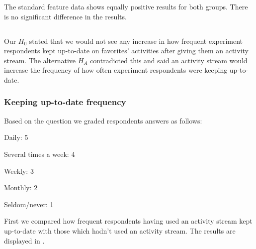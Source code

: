 The standard feature data shows equally positive results for both groups.
There is no significant difference in the results.

\subsection{%
}

Our $H_0$ stated that we would not see any increase in how frequent
experiment respondents kept up-to-date on favorites' activities after giving
them an activity stream. The alternative $H_A$ contradicted this and said
an activity stream would increase the frequency of how often experiment
respondents were keeping up-to-date.

\subsubsection{Keeping up-to-date frequency}

Based on the question
we graded respondents answers as follows: 

\begin{items}
  \item Daily: 5
  \item Several times a week: 4
  \item Weekly: 3
  \item Monthly: 2
  \item Seldom/never: 1
\end{items}

First we compared how frequent respondents having used an activity stream kept
up-to-date with those which hadn't used an activity stream. The results are
displayed in .

